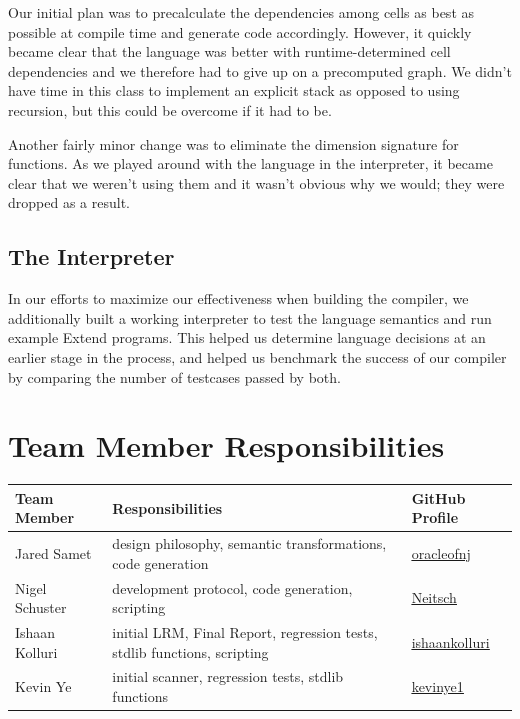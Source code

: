 Our initial plan was to precalculate the dependencies among cells as best as possible at compile time and generate code accordingly. However, it quickly became clear that the language was better with runtime-determined cell dependencies and we therefore had to give up on a precomputed graph. We didn't have time in this class to implement an explicit stack as opposed to using recursion, but this could be overcome if it had to be.

Another fairly minor change was to eliminate the dimension signature for functions. As we played around with the language in the interpreter, it became clear that we weren't using them and it wasn't obvious why we would; they were dropped as a result.


  \subsection{The Interpreter}
  In our efforts to maximize our effectiveness when building the compiler, we additionally built a working interpreter to test the language semantics and run example Extend programs. This helped us determine language decisions at an earlier stage in the process, and helped us benchmark the success of our compiler by comparing the number of testcases passed by both.

\section{Team Member Responsibilities}

\begin{tabular}{ | l | l | l |}\hline
  Team Member  & Responsibilities      & GitHub Profile\\ \hline
  Jared Samet & design philosophy, semantic transformations, code generation  & \underline{\href{https://github.com/oracleofnj}{oracleofnj}}\\
  Nigel Schuster & development protocol, code generation, scripting  & \underline{\href{https://github.com/Neitsch}{Neitsch}}\\
  Ishaan Kolluri & initial LRM, Final Report, regression tests, stdlib functions, scripting & \underline{\href{https://github.com/ishaankolluri}{ishaankolluri}}\\
  Kevin Ye & initial scanner, regression tests, stdlib functions & \underline{\href{https://github.com/kevinye1}{kevinye1}}\\ \hline
\end{tabular}

